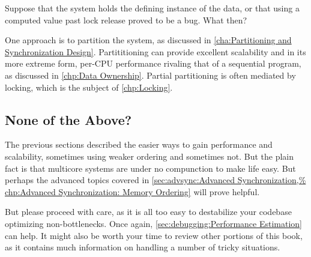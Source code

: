 Suppose that the system holds the defining instance of the data,
or that using a computed value past lock release proved to be a bug.
What then?

One approach is to partition the system, as discussed in
\cref{cha:Partitioning and Synchronization Design}.
Partititioning can provide excellent scalability and in its more
extreme form, per-CPU performance rivaling that of a sequential program,
as discussed in \cref{chp:Data Ownership}.
Partial partitioning is often mediated by locking, which is the subject of
\cref{chp:Locking}.

\subsection{None of the Above?}
\label{sec:app:questions:None of the Above?}

The previous sections described the easier ways to gain performance
and scalability, sometimes using weaker ordering and sometimes not.
But the plain fact is that multicore systems are under no compunction
to make life easy.
But perhaps the advanced topics covered in
\cref{sec:advsync:Advanced Synchronization,%
chp:Advanced Synchronization: Memory Ordering}
will prove helpful.

But please proceed with care, as it is all too easy to destabilize
your codebase optimizing non-bottlenecks.
Once again, \cref{sec:debugging:Performance Estimation} can help.
It might also be worth your time to review other portions of this
book, as it contains much information on handling a number of tricky
situations.

